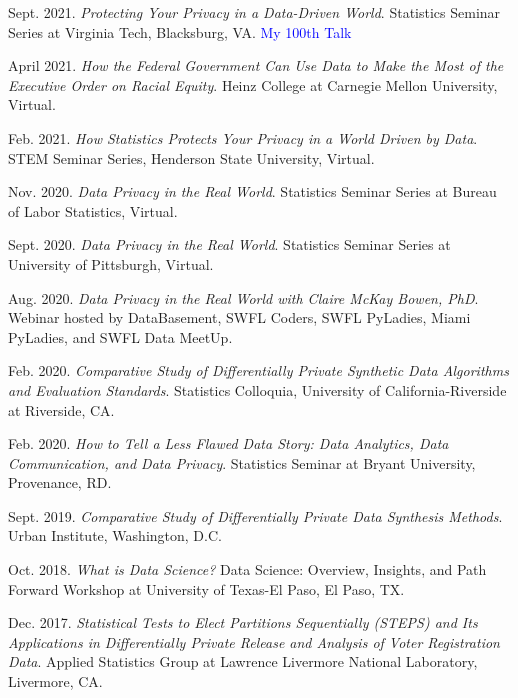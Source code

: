 \begin{etaremune}[topsep=0pt, itemsep=5pt, partopsep=0pt, parsep=0pt]
    \item Sept. 2021. \textit{Protecting Your Privacy in a Data-Driven World}. Statistics Seminar Series at Virginia Tech, Blacksburg, VA. \textcolor{blue}{My 100th Talk}
    
    \item April 2021. \textit{How the Federal Government Can Use Data to Make the Most of the Executive Order on Racial Equity}. Heinz College at Carnegie Mellon University, Virtual.

    \item Feb. 2021. \textit{How Statistics Protects Your Privacy in a World Driven by Data}. STEM Seminar Series, Henderson State University, Virtual.

    \item Nov. 2020. \textit{Data Privacy in the Real World}. Statistics Seminar Series at Bureau of Labor Statistics, Virtual.

    \item Sept. 2020. \textit{Data Privacy in the Real World}. Statistics Seminar Series at University of Pittsburgh, Virtual.
        
    \item Aug. 2020. \textit{Data Privacy in the Real World with Claire McKay Bowen, PhD}. Webinar hosted by DataBasement, SWFL Coders, SWFL PyLadies, Miami PyLadies, and SWFL Data MeetUp.
    
    \item Feb. 2020. \textit{Comparative Study of Differentially Private Synthetic Data Algorithms and Evaluation Standards}. Statistics Colloquia, University of California-Riverside at Riverside, CA.
    
    \item Feb. 2020. \textit{How to Tell a Less Flawed Data Story: Data Analytics, Data Communication, and Data Privacy}. Statistics Seminar at Bryant University, Provenance, RD.
    
    \item Sept. 2019. \textit{Comparative Study of Differentially Private Data Synthesis Methods}. Urban Institute, Washington, D.C.
    
    \item Oct. 2018. \textit{What is Data Science?} Data Science: Overview, Insights, and Path Forward Workshop at University of Texas-El Paso, El Paso, TX.
    
    \item Dec. 2017. \textit{Statistical Tests to Elect Partitions Sequentially (STEPS) and Its Applications in Differentially Private Release and Analysis of Voter Registration Data}. Applied Statistics Group at Lawrence Livermore National Laboratory, Livermore, CA.
    

\end{etaremune}
